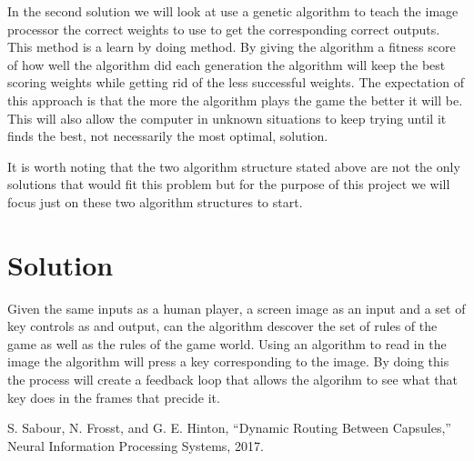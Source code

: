 \documentclass[12pt,journal,compsoc]{IEEEtran}
\begin{document}
  In the second solution we will look at use a genetic algorithm to teach the image processor the correct weights to use to get the corresponding correct outputs. This method is a learn by doing method. By giving the algorithm a fitness score of how well the algorithm did each generation the algorithm will keep the best scoring weights while getting rid of the less successful weights. The expectation of this approach is that the more the algorithm plays the game the better it will be. This will also allow the computer in unknown situations to keep trying until it finds the best, not necessarily the most optimal, solution.

  It is worth noting that the two algorithm structure stated above are not the only solutions that would fit this problem but for the purpose of this project we will focus just on these two algorithm structures to start.

\section{Solution}

Given the same inputs as a human player, a screen image as an input and a set of key controls as and output, can the algorithm descover the set of rules of the game as well as the rules of the game world. Using an algorithm to read in the image the algorithm will press a key corresponding to the image. By doing this the process will create a feedback loop that allows the algorihm to see what that key does in the frames that precide it.

\begin{thebibliography}{1}

\bibitem{}
    S. Sabour, N. Frosst, and G. E. Hinton, “Dynamic Routing Between Capsules,” Neural Information Processing Systems, 2017.
\bibitem{}


\end{thebibliography}
\end{document}
